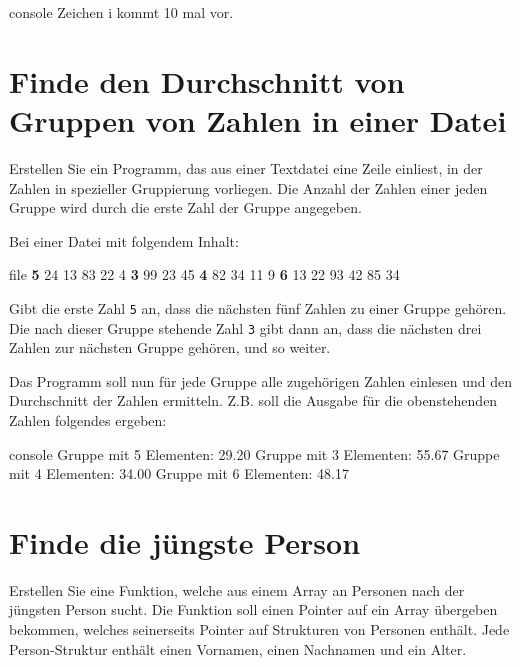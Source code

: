 \begin{mybox}[Bildschirmausgabe]{console}
Zeichen i kommt 10 mal vor.
\end{mybox}



\chapter{Finde den Durchschnitt von Gruppen von Zahlen in einer Datei}

\vspace{10pt}

Erstellen Sie ein Programm, das aus einer Textdatei eine Zeile einliest, in der
Zahlen in spezieller Gruppierung vorliegen. Die Anzahl der Zahlen einer jeden
Gruppe wird durch die erste Zahl der Gruppe angegeben.

Bei einer Datei mit folgendem Inhalt:

\begin{mybox}{file}
    \textbf{5} 24 13 83 22 4 \textbf{3} 99 23 45 \textbf{4} 82 34 11 9 \textbf{6} 13 22 93 42 85 34
\end{mybox}

Gibt die erste Zahl \texttt{5} an, dass die nächsten fünf Zahlen zu
einer Gruppe gehören. Die nach dieser Gruppe stehende Zahl \texttt{3}
gibt dann an, dass die nächsten drei Zahlen zur nächsten Gruppe gehören, und so
weiter.

Das Programm soll nun für jede Gruppe alle zugehörigen Zahlen einlesen und den
Durchschnitt der Zahlen ermitteln. Z.B. soll die Ausgabe für die obenstehenden
Zahlen folgendes ergeben:

\begin{mybox}[Bildschirmausgabe]{console}
Gruppe mit 5 Elementen: 29.20
Gruppe mit 3 Elementen: 55.67
Gruppe mit 4 Elementen: 34.00
Gruppe mit 6 Elementen: 48.17
\end{mybox}




\chapter{Finde die jüngste Person}

\vspace{10pt}

Erstellen Sie eine Funktion, welche aus einem Array an Personen nach der
jüngsten Person sucht. Die Funktion soll einen Pointer auf ein Array übergeben
bekommen, welches seinerseits Pointer auf Strukturen von Personen enthält. Jede
Person-Struktur enthält einen Vornamen, einen Nachnamen und ein Alter.

